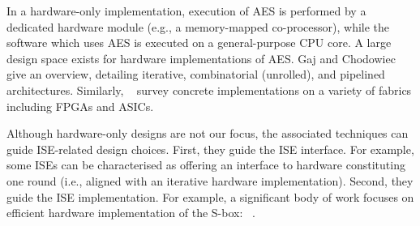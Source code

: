 
In a hardware-only implementation,
execution of 
AES
is 
performed by 
a dedicated hardware module (e.g., a memory-mapped co-processor),
while
the software which uses AES is executed on
a general-purpose CPU core.
A large design space exists for hardware implementations of AES.
Gaj and Chodowiec~\cite[Section 3.3]{GajCho:00}
give an overview, detailing
iterative,
combinatorial (unrolled),
and
pipelined architectures.
Similarly, ~\cite{PMDW:04,GooBen:05,GajCho:09}
survey concrete implementations on a variety of fabrics including FPGAs
and ASICs.

Although hardware-only designs are not our focus, the associated techniques
can guide ISE-related design choices.
First,
they guide the ISE interface.
For example, some ISEs can be characterised as offering an interface to
hardware constituting one round 
(i.e., aligned with an iterative hardware implementation).
Second,
they guide the ISE implementation.
For example, a significant body of work focuses on efficient hardware 
implementation of the S-box: ~\cite{Canright:05,BoyPer:12,ReyTahAsh:18}.

